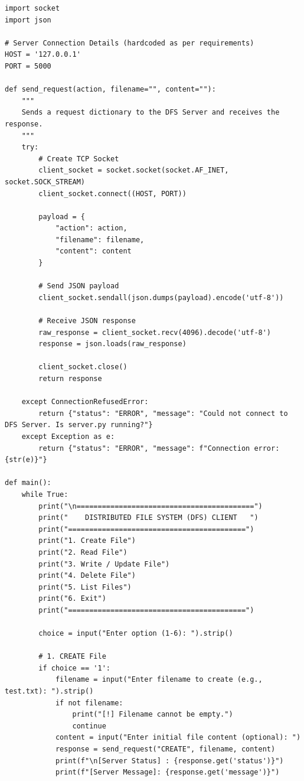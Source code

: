 \documentclass[main]{subfiles}
\begin{document}
\begin{verbatim}
import socket
import json

# Server Connection Details (hardcoded as per requirements)
HOST = '127.0.0.1'
PORT = 5000

def send_request(action, filename="", content=""):
    """
    Sends a request dictionary to the DFS Server and receives the response.
    """
    try:
        # Create TCP Socket
        client_socket = socket.socket(socket.AF_INET, socket.SOCK_STREAM)
        client_socket.connect((HOST, PORT))

        payload = {
            "action": action,
            "filename": filename,
            "content": content
        }

        # Send JSON payload
        client_socket.sendall(json.dumps(payload).encode('utf-8'))

        # Receive JSON response
        raw_response = client_socket.recv(4096).decode('utf-8')
        response = json.loads(raw_response)

        client_socket.close()
        return response

    except ConnectionRefusedError:
        return {"status": "ERROR", "message": "Could not connect to DFS Server. Is server.py running?"}
    except Exception as e:
        return {"status": "ERROR", "message": f"Connection error: {str(e)}"}

def main():
    while True:
        print("\n==========================================")
        print("    DISTRIBUTED FILE SYSTEM (DFS) CLIENT   ")
        print("==========================================")
        print("1. Create File")
        print("2. Read File")
        print("3. Write / Update File")
        print("4. Delete File")
        print("5. List Files")
        print("6. Exit")
        print("==========================================")
        
        choice = input("Enter option (1-6): ").strip()

        # 1. CREATE File
        if choice == '1':
            filename = input("Enter filename to create (e.g., test.txt): ").strip()
            if not filename:
                print("[!] Filename cannot be empty.")
                continue
            content = input("Enter initial file content (optional): ")
            response = send_request("CREATE", filename, content)
            print(f"\n[Server Status] : {response.get('status')}")
            print(f"[Server Message]: {response.get('message')}")


\end{verbatim}
\end{document}

